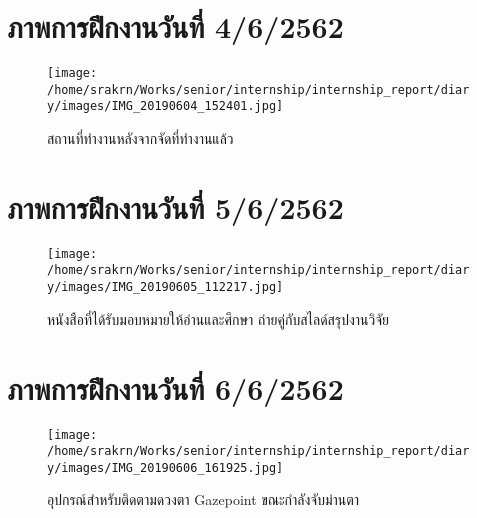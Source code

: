 
\section*{ภาพการฝึกงานวันที่ 4/6/2562}
\begin{figure}[h]
    \centering
    \texttt{[image: /home/srakrn/Works/senior/internship/internship\_report/diary/images/IMG\_20190604\_152401.jpg]}
    \caption{สถานที่ทำงานหลังจากจัดที่ทำงานแล้ว}
\end{figure}

\section*{ภาพการฝึกงานวันที่ 5/6/2562}
\begin{figure}[h]
    \centering
    \texttt{[image: /home/srakrn/Works/senior/internship/internship\_report/diary/images/IMG\_20190605\_112217.jpg]}
    \caption{หนังสือที่ได้รับมอบหมายให้อ่านและศึกษา ถ่ายคู่กับสไลด์สรุปงานวิจัย}
\end{figure}

\section*{ภาพการฝึกงานวันที่ 6/6/2562}
\begin{figure}[h]
    \centering
    \texttt{[image: /home/srakrn/Works/senior/internship/internship\_report/diary/images/IMG\_20190606\_161925.jpg]}
    \caption{อุปกรณ์สำหรับติดตามดวงตา Gazepoint ขณะกำลังจับม่านตา}
\end{figure}

